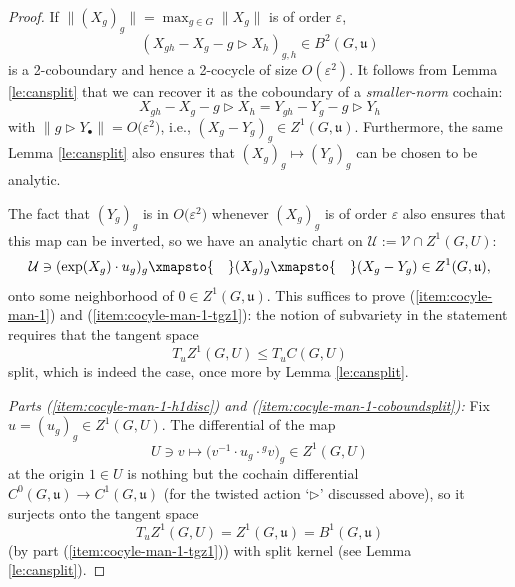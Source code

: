 \documentclass[pdftex]{sigma}
\numberwithin{equation}{section}
\newcommand\cU{{\mathcal U}}
\newcommand\cV{{\mathcal V}}
\newcommand\fu{{\mathfrak u}}
\begin{document}
\begin{proof}
 If $\|(X_g)_g\| = \max_{g\in G} \|X_g\|$ is of order $\varepsilon$,
 \begin{equation*}
 \left(X_{gh} - X_g - g\triangleright X_h\right)_{g,h}\in B^2(G,\fu)
 \end{equation*}
 is a 2-coboundary and hence a 2-cocycle of size $O(\varepsilon^2)$. It follows from Lemma \ref{le:cansplit} that we can recover it as the coboundary of a {\it smaller-norm} cochain:
 \begin{equation*}
 X_{gh} - X_g - g\triangleright X_h
 =
 Y_{gh} - Y_g - g\triangleright Y_h
 \end{equation*}
 with $\|g\triangleright Y_{\bullet}\|=O\big(\varepsilon^2\big)$, i.e., $(X_g-Y_g)_g\in Z^1(G,\fu)$.
 Furthermore, the same Lemma \ref{le:cansplit} also ensures that $(X_g)_g\mapsto (Y_g)_g$ can be chosen to be analytic.

 The fact that $(Y_g)_g$ is in $O\big(\varepsilon^2\big)$ whenever $(X_g)_g$ is of order $\varepsilon$ also ensures that this map can be inverted, so we have an analytic chart on $\cU:=\cV\cap Z^1(G,U)$:
 \begin{equation*}
 \cU\ni (\exp(X_g)\cdot u_g)_g
 \xmapsto{\quad}
 (X_g)_g
 \xmapsto{\quad}
 (X_g-Y_g)\in Z^1(G,\fu),
 \end{equation*}
 onto some neighborhood of $0\in Z^1(G,\fu)$. This suffices to prove (\ref{item:cocyle-man-1}) and (\ref{item:cocyle-man-1-tgz1}): the notion of subvariety in the statement requires that the tangent space
 \begin{equation*}
 T_u Z^1(G,U)\le T_u C(G,U)
 \end{equation*}
 split, which is indeed the case, once more by Lemma \ref{le:cansplit}.

\emph{ Parts {\rm(\ref{item:cocyle-man-1-h1disc})} and {\rm(\ref{item:cocyle-man-1-coboundsplit})}:} Fix $u=(u_g)_g\in Z^1(G,U)$.
 The differential of the map
 \begin{equation}\label{eq:noncommdiff}
 U\ni v\mapsto \big(v^{-1}\cdot u_g\cdot {}^g v\big)_g\in Z^1(G,U)
 \end{equation}
 at the origin $1\in U$ is nothing but the cochain differential $C^0(G,\fu)\to C^1(G,\fu)$ (for the twisted action `$\triangleright$' discussed above), so it surjects onto the tangent space
 \begin{equation*}
 T_u Z^1(G,U) = Z^1(G,\fu) = B^1(G,\fu)
 \end{equation*}
 (by part (\ref{item:cocyle-man-1-tgz1})) with split kernel (see Lemma \ref{le:cansplit}).


\end{proof}
\end{document}
